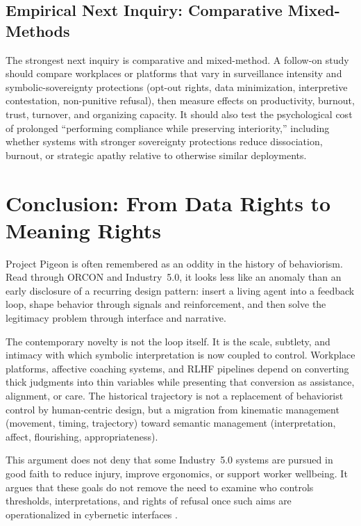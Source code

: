 \documentclass[runningheads]{llncs}
\begin{document}
\subsection{Empirical Next Inquiry: Comparative Mixed-Methods}

The strongest next inquiry is comparative and mixed-method. A follow-on study should compare workplaces or platforms that vary in surveillance intensity and symbolic-sovereignty protections (opt-out rights, data minimization, interpretive contestation, non-punitive refusal), then measure effects on productivity, burnout, trust, turnover, and organizing capacity. It should also test the psychological cost of prolonged ``performing compliance while preserving interiority,'' including whether systems with stronger sovereignty protections reduce dissociation, burnout, or strategic apathy relative to otherwise similar deployments.

\section{Conclusion: From Data Rights to Meaning Rights}

Project Pigeon is often remembered as an oddity in the history of behaviorism. Read through ORCON and Industry~5.0, it looks less like an anomaly than an early disclosure of a recurring design pattern: insert a living agent into a feedback loop, shape behavior through signals and reinforcement, and then solve the legitimacy problem through interface and narrative.

The contemporary novelty is not the loop itself. It is the scale, subtlety, and intimacy with which symbolic interpretation is now coupled to control. Workplace platforms, affective coaching systems, and RLHF pipelines depend on converting thick judgments into thin variables while presenting that conversion as assistance, alignment, or care. The historical trajectory is not a replacement of behaviorist control by human-centric design, but a migration from kinematic management (movement, timing, trajectory) toward semantic management (interpretation, affect, flourishing, appropriateness).

This argument does not deny that some Industry~5.0 systems are pursued in good faith to reduce injury, improve ergonomics, or support worker wellbeing. It argues that these goals do not remove the need to examine who controls thresholds, interpretations, and rights of refusal once such aims are operationalized in cybernetic interfaces \cite{breque2021industry}.
\end{document}
